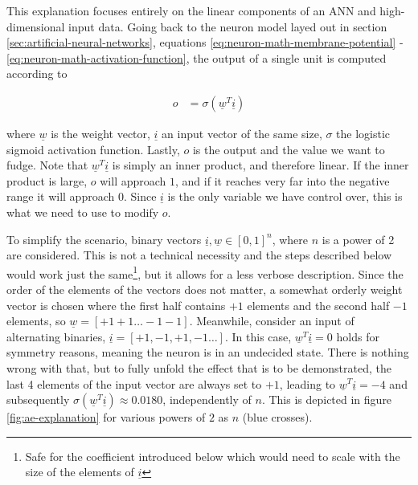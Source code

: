 \documentclass[11pt, a4paper]{article}
\newcommand\braces[1]{\left(#1\right)}
\newcommand\brackets[1]{\left[#1\right]}
\renewcommand{\vec}[1]{\underline{#1}}
\begin{document}
This explanation focuses entirely on the linear components of an ANN and high-dimensional input data. Going back to the neuron model layed out in section \ref{sec:artificial-neural-networks}, equations \eqref{eq:neuron-math-membrane-potential} - \eqref{eq:neuron-math-activation-function}, the output of a single unit is computed according to

\begin{align}
	o &= \sigma \braces{\vec{w}^T \vec{i}}
\end{align}

where $\vec{w}$ is the weight vector, $\vec{i}$ an input vector of the same size, $\sigma$ the logistic sigmoid activation function. Lastly, $o$ is the output and the value we want to fudge. Note that $\vec{w}^T \vec{i}$ is simply an inner product, and therefore linear. If the inner product is large, $o$ will approach $1$, and if it reaches very far into the negative range it will approach $0$. Since $\vec{i}$ is the only variable we have control over, this is what we need to use to modify $o$.

To simplify the scenario, binary vectors $\vec{i}, \vec{w} \in \brackets{0,1}^n$, where $n$ is a power of 2 are considered. This is not a technical necessity and the steps described below would work just the same\footnote{Safe for the coefficient introduced below which would need to scale with the size of the elements of $\vec{i}$}, but it allows for a less verbose description. Since the order of the elements of the vectors does not matter, a somewhat orderly weight vector is chosen where the first half contains $+1$ elements and the second half $-1$ elements, so $\vec{w} = \brackets{+1 +1 \dots -1 -1}$. Meanwhile, consider an input of alternating binaries, $\vec{i} = \brackets{+1, -1, +1, -1 \dots}$. In this case, $\vec{w}^T \vec{i} = 0$ holds for symmetry reasons, meaning the neuron is in an undecided state. There is nothing wrong with that, but to fully unfold the effect that is to be demonstrated, the last 4 elements of the input vector are always set to $+1$, leading to $\vec{w}^T \vec{i} = -4$ and subsequently $\sigma \braces{\vec{w}^T \vec{i}} \approx 0.0180$, independently of $n$. This is depicted in figure \ref{fig:ae-explanation} for various powers of $2$ as $n$ (blue crosses).
\end{document}
